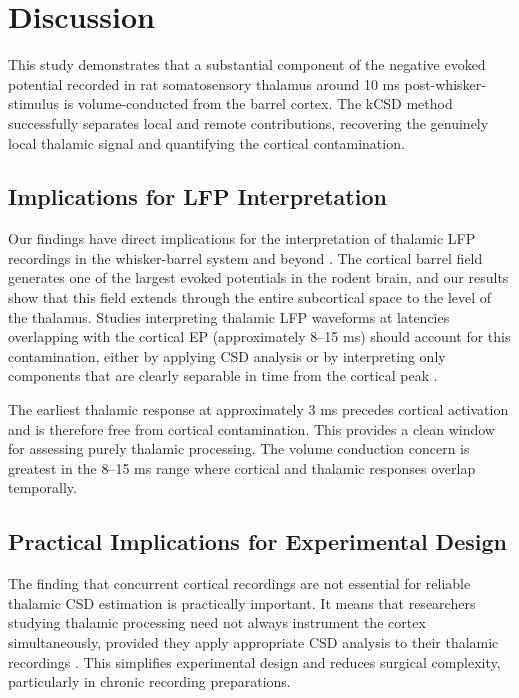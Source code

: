 \documentclass[12pt]{article}
\begin{document}
\section{Discussion}

This study demonstrates that a substantial component of the negative evoked potential recorded in rat somatosensory thalamus around 10 ms post-whisker-stimulus is volume-conducted from the barrel cortex. The kCSD method successfully separates local and remote contributions, recovering the genuinely local thalamic signal and quantifying the cortical contamination.

\subsection{Implications for LFP Interpretation}

Our findings have direct implications for the interpretation of thalamic LFP recordings in the whisker-barrel system and beyond \citep{buzsaki2012origin, einevoll2013modelling}. The cortical barrel field generates one of the largest evoked potentials in the rodent brain, and our results show that this field extends through the entire subcortical space to the level of the thalamus. Studies interpreting thalamic LFP waveforms at latencies overlapping with the cortical EP (approximately 8--15 ms) should account for this contamination, either by applying CSD analysis or by interpreting only components that are clearly separable in time from the cortical peak \citep{steriade2001thalamocortical}.

The earliest thalamic response at approximately 3 ms precedes cortical activation and is therefore free from cortical contamination. This provides a clean window for assessing purely thalamic processing. The volume conduction concern is greatest in the 8--15 ms range where cortical and thalamic responses overlap temporally.

\subsection{Practical Implications for Experimental Design}

The finding that concurrent cortical recordings are not essential for reliable thalamic CSD estimation is practically important. It means that researchers studying thalamic processing need not always instrument the cortex simultaneously, provided they apply appropriate CSD analysis to their thalamic recordings \citep{potworowski2012kcsd, leski2011inverse}. This simplifies experimental design and reduces surgical complexity, particularly in chronic recording preparations.
\end{document}
